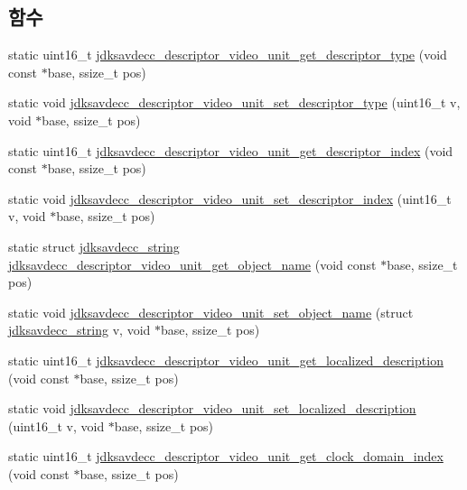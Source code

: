\subsection*{함수}
\begin{DoxyCompactItemize}
\item 
static uint16\+\_\+t \hyperlink{group__descriptor__video_gada9bd76b0909493f2526da1e0a36eb82}{jdksavdecc\+\_\+descriptor\+\_\+video\+\_\+unit\+\_\+get\+\_\+descriptor\+\_\+type} (void const $\ast$base, ssize\+\_\+t pos)
\item 
static void \hyperlink{group__descriptor__video_gad99b359987064c159ab6a8b550fa37bd}{jdksavdecc\+\_\+descriptor\+\_\+video\+\_\+unit\+\_\+set\+\_\+descriptor\+\_\+type} (uint16\+\_\+t v, void $\ast$base, ssize\+\_\+t pos)
\item 
static uint16\+\_\+t \hyperlink{group__descriptor__video_ga690c3282d5e4c92556e8dbe7a9d5c6f7}{jdksavdecc\+\_\+descriptor\+\_\+video\+\_\+unit\+\_\+get\+\_\+descriptor\+\_\+index} (void const $\ast$base, ssize\+\_\+t pos)
\item 
static void \hyperlink{group__descriptor__video_ga18268a1d42339769a770d537fb6a86f6}{jdksavdecc\+\_\+descriptor\+\_\+video\+\_\+unit\+\_\+set\+\_\+descriptor\+\_\+index} (uint16\+\_\+t v, void $\ast$base, ssize\+\_\+t pos)
\item 
static struct \hyperlink{structjdksavdecc__string}{jdksavdecc\+\_\+string} \hyperlink{group__descriptor__video_ga53281a94748c059175ceb96da6b3022e}{jdksavdecc\+\_\+descriptor\+\_\+video\+\_\+unit\+\_\+get\+\_\+object\+\_\+name} (void const $\ast$base, ssize\+\_\+t pos)
\item 
static void \hyperlink{group__descriptor__video_ga90a564a1d47c1533b56c5ae21ced2b6e}{jdksavdecc\+\_\+descriptor\+\_\+video\+\_\+unit\+\_\+set\+\_\+object\+\_\+name} (struct \hyperlink{structjdksavdecc__string}{jdksavdecc\+\_\+string} v, void $\ast$base, ssize\+\_\+t pos)
\item 
static uint16\+\_\+t \hyperlink{group__descriptor__video_ga1e0ce4888ad273b5c73d4aee66ac5eba}{jdksavdecc\+\_\+descriptor\+\_\+video\+\_\+unit\+\_\+get\+\_\+localized\+\_\+description} (void const $\ast$base, ssize\+\_\+t pos)
\item 
static void \hyperlink{group__descriptor__video_ga0cd32ebc3a78b8837a687dba54d82f18}{jdksavdecc\+\_\+descriptor\+\_\+video\+\_\+unit\+\_\+set\+\_\+localized\+\_\+description} (uint16\+\_\+t v, void $\ast$base, ssize\+\_\+t pos)
\item 
static uint16\+\_\+t \hyperlink{group__descriptor__video_ga964ea86012ff42f3aa4704ad9b900a86}{jdksavdecc\+\_\+descriptor\+\_\+video\+\_\+unit\+\_\+get\+\_\+clock\+\_\+domain\+\_\+index} (void const $\ast$base, ssize\+\_\+t pos)

\end{DoxyCompactItemize}
